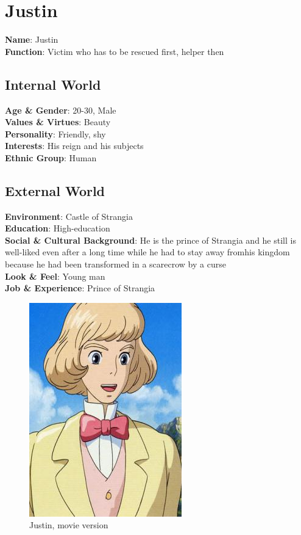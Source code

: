 \section{Justin}

\begin{minipage}{0.5\textwidth}
\textbf{Name}: Justin \\
\textbf{Function}: Victim who has to be rescued first, helper then

\subsection{Internal World}

\textbf{Age \& Gender}: 20-30, Male \\
\textbf{Values \& Virtues}: Beauty \\
\textbf{Personality}: Friendly, shy \\
\textbf{Interests}: His reign and his subjects \\
\textbf{Ethnic Group}: Human

\subsection{External World}
\textbf{Environment}: Castle of Strangia\\
\textbf{Education}: High-education \\
\textbf{Social \& Cultural Background}: He is the prince of Strangia and he still is well-liked even after a long time while he had to stay away fromhis kingdom because he had been transformed in a scarecrow by a curse \\
\textbf{Look \& Feel}: Young man   \\
\textbf{Job \& Experience}: Prince of Strangia \\

\end{minipage}%
%
\hfill\begin{minipage}{0.4\textwidth}
  \begin{figure}[H]
  \includegraphics{Images/Characters/justin}
  \caption{Justin, movie version }
\end{figure}
\end{minipage}

